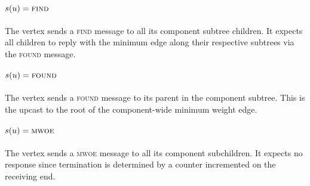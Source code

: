 \documentclass[11pt,epsf]{article}
\begin{document}
{{    \paragraph{$s(u) = \textsc{find}$}{
      The vertex sends a \textsc{find} message to all its component subtree children. It expects all children
      to reply with the minimum edge along their respective subtrees via the \textsc{found} message.
    }
    \paragraph{$s(u) = \textsc{found}$}{
      The vertex sends a \textsc{found} message to its parent in the component subtree. This is the upcast
      to the root of the component-wide minimum weight edge.
    }
    \paragraph{$s(u) = \textsc{mwoe}$}{
      The vertex sends a \textsc{mwoe} message to all its component subchildren. It expects no response
      since termination is determined by a counter incremented on the receiving end.
    }

}}
\end{document}
